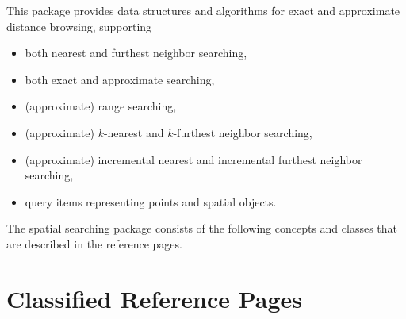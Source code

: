 

This package provides data structures and algorithms for exact and approximate distance browsing,
supporting

\begin{itemize} 

\item
both nearest and furthest neighbor searching,

\item
both exact and approximate searching,

\item
(approximate) range searching,

\item 
(approximate) $k$-nearest and $k$-furthest neighbor searching,

\item 
(approximate) incremental nearest and incremental furthest neighbor searching,

\item
query items representing points and spatial objects.

\end{itemize}



The spatial searching package consists of the following concepts and
classes that are described in the reference pages.



\section{Classified Reference Pages}


 \\
 \\
 \\
 \\

